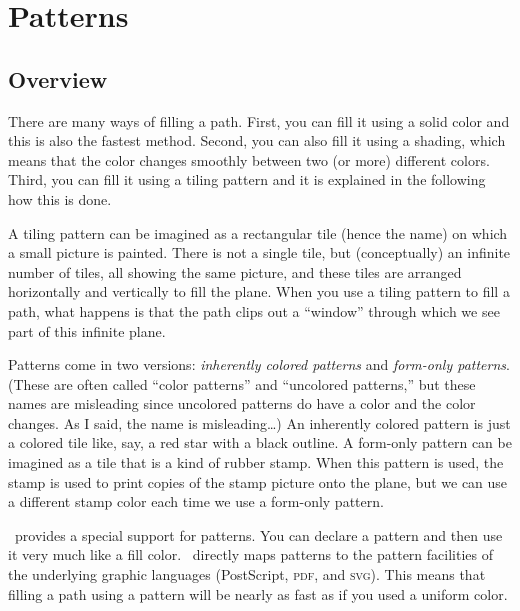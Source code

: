 %
%
%


\section{Patterns}

\label{section-patterns}

\subsection{Overview}

There are many ways of filling a path. First, you can fill it using a
solid color and this is also the fastest method. Second, you can also
fill it using a shading, which means that the color changes smoothly
between two (or more) different colors. Third, you can fill it using a
tiling pattern and it is explained in the following how this is done.

A tiling pattern can be imagined as a rectangular tile (hence the
name) on which a small picture is painted. There is not a single tile,
but (conceptually) an infinite number of tiles, all showing the same
picture, and these tiles are arranged horizontally and vertically to
fill the plane. When you use a tiling pattern to fill a path, what
happens is that the path clips out a ``window'' through which we see
part of this infinite plane.

Patterns come in two versions: \emph{inherently colored patterns} and
\emph{form-only patterns}. (These are often called ``color patterns''
and ``uncolored patterns,'' but these names are misleading since
uncolored patterns do have a color and the color changes. As I said,
the name is misleading\dots) An inherently colored pattern is just a
colored tile like, say, a red star with a black outline. A form-only
pattern can be imagined as a tile that is a kind of rubber stamp. When
this pattern is used, the stamp is used to print copies of the stamp
picture onto the plane, but we can use a different stamp color each
time we use a form-only pattern.

\pgfname\ provides a special support for patterns. You can declare a
pattern and then use it very much like a fill color. \pgfname\
directly maps patterns to the pattern facilities of the underlying
graphic languages (PostScript, \textsc{pdf}, and \textsc{svg}). This
means that filling a path using a pattern will be nearly as fast as if
you used a uniform color.

